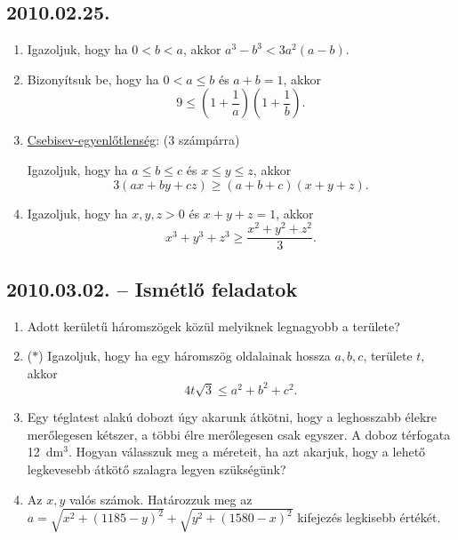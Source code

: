 \subsection*{2010.02.25.}
\begin{enumerate}
\item Igazoljuk, hogy ha $0<b<a$, akkor $a^3-b^3<3a^2(a-b)$.
\item Bizonyítsuk be, hogy ha $0<a\le b$ és $a+b=1$, akkor
$$9\le\left(1+\dfrac{1}{a}\right)\left(1+\dfrac{1}{b}\right).$$
\item \underline{Csebisev-egyenlőtlenség}: (3 számpárra)

\noindent Igazoljuk, hogy ha $a\le b \le c$ és $x\le y \le z$, akkor
$$3(ax+by+cz)\ge (a+b+c)(x+y+z).$$

\item Igazoljuk, hogy ha $x,y,z>0$ és $x+y+z=1$, akkor 
$$x^3+y^3+z^3\ge \dfrac{x^2+y^2+z^2}{3}.$$
\end{enumerate}

\subsection*{2010.03.02. -- Ismétlő feladatok}
\begin{enumerate}
\item Adott kerületű háromszögek közül melyiknek legnagyobb a területe?
\item ($*$) Igazoljuk, hogy ha egy háromszög oldalainak hossza $a,b,c$, területe $t$, akkor
$$4t\sqrt{3}\le a^2+b^2+c^2.$$
\item Egy téglatest alakú dobozt úgy akarunk átkötni, hogy a leghosszabb élekre merőlegesen kétszer, a többi élre merőlegesen csak egyszer. A doboz térfogata 12~dm$^3$. Hogyan válasszuk meg a méreteit, ha azt akarjuk, hogy a lehető legkevesebb átkötő szalagra legyen szükségünk?
\item Az $x,y$ valós számok. Határozzuk meg az 
$a=\sqrt{x^2+(1185-y)^2}+\sqrt{y^2+(1580-x)^2}$ kifejezés legkisebb értékét.
\end{enumerate}

